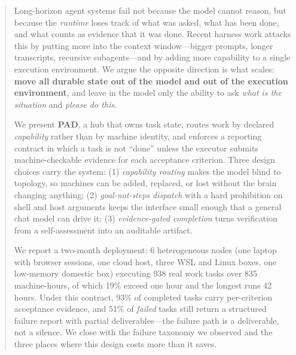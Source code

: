 \documentclass{article}
\begin{document}

\begin{icmlauthorlist}
\end{icmlauthorlist}




\vskip 0.3in
\printAffiliationsAndNotice{}

\begin{abstract}
Long-horizon agent systems fail not because the model cannot reason, but because the
\emph{runtime} loses track of what was asked, what has been done, and what counts as
evidence that it was done. Recent harness work attacks this by putting more into the
context window---bigger prompts, longer transcripts, recursive subagents---and by
adding more capability to a single execution environment. We argue the opposite
direction is what scales: \textbf{move all durable state out of the model and out of
the execution environment}, and leave in the model only the ability to ask
\emph{what is the situation} and \emph{please do this}.

We present \textbf{PAD}, a hub that owns task state, routes work by declared
\emph{capability} rather than by machine identity, and enforces a reporting contract
in which a task is not ``done'' unless the executor submits machine-checkable
evidence for each acceptance criterion. Three design choices carry the system:
(1) \emph{capability routing} makes the model blind to topology, so machines can be
added, replaced, or lost without the brain changing anything;
(2) \emph{goal-not-steps dispatch} with a hard prohibition on shell and host
arguments keeps the interface small enough that a general chat model can drive it;
(3) \emph{evidence-gated completion} turns verification from a self-assessment into
an auditable artifact.

We report a two-month deployment: 6 heterogeneous nodes (one laptop with browser
sessions, one cloud host, three WSL and Linux boxes, one low-memory domestic box)
executing 938 real work tasks over 835 machine-hours, of which 19\% exceed one hour
and the longest runs 42 hours. Under this contract, 93\% of completed tasks carry
per-criterion acceptance evidence, and 51\% of \emph{failed} tasks still return a
structured failure report with partial deliverables---the failure path is a
deliverable, not a silence. We close with the failure taxonomy we observed and the
three places where this design costs more than it saves.
\end{abstract}
\end{document}
